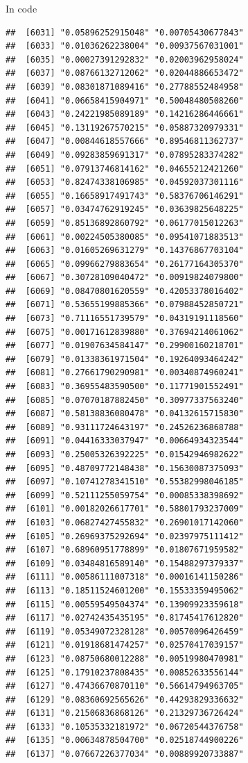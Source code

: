 \documentclass[ignorenonframetext,]{beamer}
\begin{document}
\begin{frame}[fragile]{In code}
\begin{verbatim}
##  [6031] "0.05896252915048" "0.00705430677843"
##  [6033] "0.01036262238004" "0.00937567031001"
##  [6035] "0.00027391292832" "0.02003962958024"
##  [6037] "0.08766132712062" "0.02044886653472"
##  [6039] "0.08301871089416" "0.27788552484958"
##  [6041] "0.06658415904971" "0.50048480508260"
##  [6043] "0.24221985089189" "0.14216286446661"
##  [6045] "0.13119267570215" "0.05887320979331"
##  [6047] "0.00844618557666" "0.89546811362737"
##  [6049] "0.09283859691317" "0.07895283374282"
##  [6051] "0.07913746814162" "0.04655212421260"
##  [6053] "0.82474338106985" "0.04592037301116"
##  [6055] "0.16658917491743" "0.58376706146291"
##  [6057] "0.03474762919245" "0.03639825648225"
##  [6059] "0.85136892860792" "0.06177015012263"
##  [6061] "0.00224505380085" "0.09541071883513"
##  [6063] "0.01605269631279" "0.14376867703104"
##  [6065] "0.09966279883654" "0.26177164305370"
##  [6067] "0.30728109040472" "0.00919824079800"
##  [6069] "0.08470801620559" "0.42053378016402"
##  [6071] "0.53655199885366" "0.07988452850721"
##  [6073] "0.71116551739579" "0.04319191118560"
##  [6075] "0.00171612839880" "0.37694214061062"
##  [6077] "0.01907634584147" "0.29900160218701"
##  [6079] "0.01338361971504" "0.19264093464242"
##  [6081] "0.27661790290981" "0.00340874960241"
##  [6083] "0.36955483590500" "0.11771901552491"
##  [6085] "0.07070187882450" "0.30977337563240"
##  [6087] "0.58138836080478" "0.04132615715830"
##  [6089] "0.93111724643197" "0.24526236868788"
##  [6091] "0.04416333037947" "0.00664934323544"
##  [6093] "0.25005326392225" "0.01542946982622"
##  [6095] "0.48709772148438" "0.15630087375093"
##  [6097] "0.10741278341510" "0.55382998046185"
##  [6099] "0.52111255059754" "0.00085338398692"
##  [6101] "0.00182026617701" "0.58801793237009"
##  [6103] "0.06827427455832" "0.26901017142060"
##  [6105] "0.26969375292694" "0.02397975111412"
##  [6107] "0.68960951778899" "0.01807671959582"
##  [6109] "0.03484816589140" "0.15488297379337"
##  [6111] "0.00586111007318" "0.00016141150286"
##  [6113] "0.18511524601200" "0.15533359495062"
##  [6115] "0.00559549504374" "0.13909923359618"
##  [6117] "0.02742435435195" "0.81745417612820"
##  [6119] "0.05349072328128" "0.00570096426459"
##  [6121] "0.01918681474257" "0.02570417039157"
##  [6123] "0.08750680012288" "0.00519980470981"
##  [6125] "0.17910237808435" "0.00852633556144"
##  [6127] "0.47436670870110" "0.56614794963705"
##  [6129] "0.08360692565626" "0.44293829336632"
##  [6131] "0.21506836868126" "0.21329736726424"
##  [6133] "0.10535332181972" "0.06720544376758"
##  [6135] "0.00634878504700" "0.02518744900226"
##  [6137] "0.07667226377034" "0.00889920733887"

\end{verbatim}
\end{frame}
\end{document}
